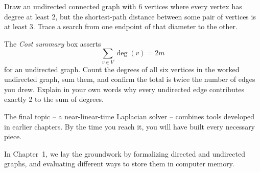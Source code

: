 \begin{exercise}
Draw an undirected connected graph with 6 vertices where every vertex has degree at
least 2, but the shortest-path distance between some pair of vertices is at least 3.
Trace a search from one endpoint of that diameter to the other.
\end{exercise}

\begin{exercise}
The \emph{Cost summary} box asserts
\[ \sum_{v \in V} \deg(v) = 2m \]
for an undirected graph. Count the degrees of all six vertices in the worked undirected graph, sum them, and confirm the total is twice the number of edges you drew. Explain in your own words why every undirected edge contributes exactly 2 to the sum of degrees.
\end{exercise}

The final topic -- a near-linear-time Laplacian solver -- combines tools developed in earlier chapters. By the time you reach it, you will have built every necessary piece.

In Chapter~1, we lay the groundwork by formalizing directed and undirected graphs, and evaluating different ways to store them in computer memory.

\chapterline
